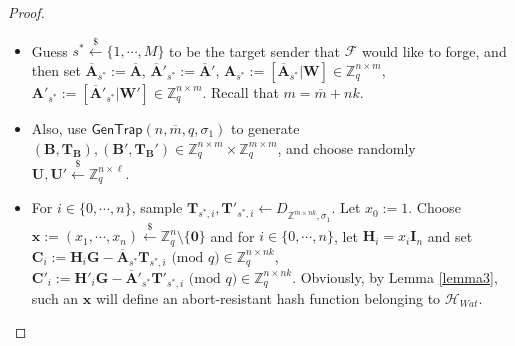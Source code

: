 \documentclass[a4paper,11pt,onecolumn]{elsarticle}
\def\cal{\mathcal}
\def\bf{\mathbf}
\begin{document}
\begin{proof}
\begin{itemize}
			\item Guess $s^* \xleftarrow{\$} \{1, \cdots, M\}$ to be the target sender that $\mathcal{F}$ would like to forge, and then set $\overline{\bf{A}}_{s^*}:=\overline{\bf{A}}$, $\overline{\bf{A}}'_{s^*}:=\overline{\bf{A}}'$,  $\mathbf{A}_{s^*}:=[\overline{\mathbf{A}}_{s^*}|\mathbf{W}] \in \mathbb{Z}_q^{n \times m}$, $\mathbf{A}'_{s^*}:=[\overline{\mathbf{A}}'_{s^*}|\mathbf{W}'] \in \mathbb{Z}_q^{n \times m}$. Recall  that $m=\overline{m}+nk.$
		
			\item Also, use $\textsf{GenTrap}(n, \overline{m},q, \sigma_1)$ to generate  $(\mathbf{B}, \mathbf{T}_{\textbf{B}}), (\mathbf{B}', \mathbf{T}_{\textbf{B}}') \in  \mathbb{Z}_q^{n \times m} \times \mathbb{Z}_q^{m \times m}$, and choose randomly $\mathbf{U},\mathbf{U}' \xleftarrow{\$} \mathbb{Z}_q ^{n \times \ell}$.
			\item For $i \in \{0, \cdots, n\}$, sample $ \mathbf{T}_{s^*,i}, \mathbf{T}'_{s^*,i} \leftarrow D_{\mathbb{Z}^{\overline{m}\times nk}, \sigma_1} $. Let $x_0:=1$. Choose $\textbf{x}:=(x_1, \cdots, x_n)\xleftarrow{\$}\mathbb{Z}_q^n\setminus \{\textbf{0}\}$ and for  $i \in \{0, \cdots, n\}$, let  $\textbf{H}_i=x_i\textbf{I}_n$ and set $\textbf{C}_i:=\textbf{H}_i\textbf{G}- \overline{\bf{A}}_{s^*} \textbf{T}_{s^*,i} \text{ (mod } q) \in \mathbb{Z}_q^{n \times nk}$, $\textbf{C}'_i:=\textbf{H}'_i\textbf{G}- \overline{\bf{A}}'_{s^*} \textbf{T}'_{s^*,i} \text{ (mod } q) \in \mathbb{Z}_q^{n \times nk}$. Obviously, by Lemma \ref{lemma3}, such an $\textbf{x}$ will define an abort-resistant hash function belonging to $\mathcal{H}_{Wat}$.
	

\end{itemize}
\end{proof}
\end{document}

